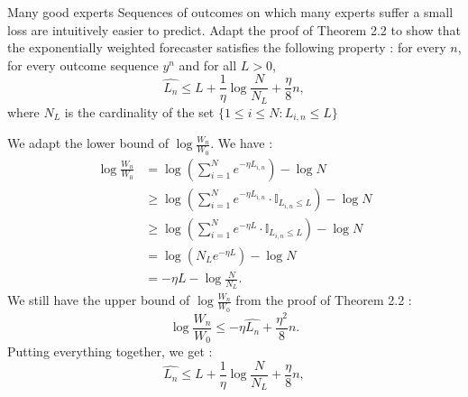 \begin{exercise}[]{Many good experts}
	Sequences of outcomes on which many experts suffer a small loss are intuitively easier to predict. Adapt the proof of Theorem 2.2 to show that the exponentially weighted forecaster satisfies the following property : for every $ n $, for every outcome sequence $ y^{n} $ and for all $ L >0 $,
\begin{equation*}
	\widehat{L_n} \leq L + \frac{1}{\eta}\log \frac{N}{N_L} + \frac{\eta}{8}n,
\end{equation*}
where $ N_L $ is the cardinality of the set $ \{ 1 \leq i \leq N : L_{i,n} \leq L \} $
\end{exercise}

\begin{solution}[]
	We adapt the lower bound of $ \log \frac{W_n}{W_0} $. We have :
\begin{align*}
	\log \frac{W_n}{W_0} &= \log \left( \sum_{i=1}^{N}e^{-\eta L_{i,n}} \right) - \log N \\
			     &\geq \log \left( \sum_{i=1}^{N}e^{-\eta L_{i,n}}\cdot \mathbb{I}_{L_{i,n}\leq L} \right) - \log N \\
			     &\geq \log \left( \sum_{i=1}^{N}e^{-\eta L}\cdot \mathbb{I}_{L_{i,n}\leq L} \right) - \log N \\
			     &=\log \left( N_L e^{-\eta L} \right) - \log N \\
			     &= - \eta L - \log \frac{N}{N_L}.
\end{align*}
We still have the upper bound of $ \log \frac{W_n}{W_0} $ from the proof of Theorem 2.2 :
\begin{equation*}
	\log \frac{W_n}{W_0} \leq -\eta \widehat{L_n} + \frac{\eta^2}{8}n.
\end{equation*}
Putting everything together, we get :
\begin{equation*}
	\widehat{L_n} \leq L + \frac{1}{\eta}\log \frac{N}{N_L} + \frac{\eta}{8}n,
\end{equation*}


\end{solution}
